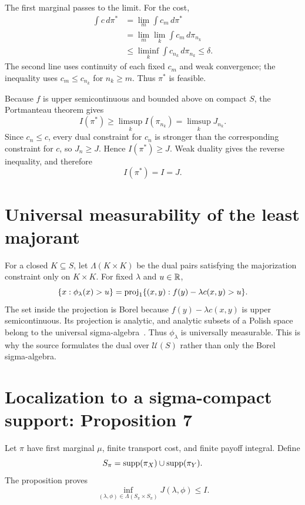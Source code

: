 The first marginal passes to the limit.  For the cost,
\begin{align*}
 \int c\,d\pi^*
 &=\lim_m\int c_m\,d\pi^*\\
 &=\lim_m\lim_k\int c_m\,d\pi_{n_k}\\
 &\le\liminf_k\int c_{n_k}\,d\pi_{n_k}\le\delta.
\end{align*}
The second line uses continuity of each fixed $c_m$ and weak convergence; the inequality uses
$c_m\le c_{n_k}$ for $n_k\ge m$.  Thus $\pi^*$ is feasible.

Because $f$ is upper semicontinuous and bounded above on compact $S$, the Portmanteau theorem gives
\[
 I(\pi^*)\ge\limsup_k I(\pi_{n_k})=
 \limsup_k J_{n_k}.
\]
Since $c_n\le c$, every dual constraint for $c_n$ is stronger than the corresponding constraint for
$c$, so $J_n\ge J$.  Hence $I(\pi^*)\ge J$.  Weak duality gives the reverse inequality, and therefore
\[
 I(\pi^*)=I=J.
\]

\section{Universal measurability of the least majorant}
For a closed $K\subseteq S$, let $\Lambda(K\times K)$ be the dual pairs satisfying the majorization
constraint only on $K\times K$.  For fixed $\lambda$ and $u\in\mathbb{R}$,
\[
 \{x:\phi_\lambda(x)>u\}
 =\operatorname{proj}_1\{(x,y):f(y)-\lambda c(x,y)>u\}.
\]
The set inside the projection is Borel because $f(y)-\lambda c(x,y)$ is upper semicontinuous.
Its projection is analytic, and analytic subsets of a Polish space belong to the universal
sigma-algebra~\cite[Chapter~7]{BertsekasShreve1978}.  Thus $\phi_\lambda$ is universally measurable.  This is why the source formulates
the dual over $\mathcal U(S)$ rather than only the Borel sigma-algebra.

\section{Localization to a sigma-compact support: Proposition 7}
Let $\pi$ have first marginal $\mu$, finite transport cost, and finite payoff integral.  Define
\[
 S_\pi=\operatorname{supp}(\pi_X)\cup\operatorname{supp}(\pi_Y).
\]
The proposition proves
\begin{equation}
 \inf_{(\lambda,\phi)\in\Lambda(S_\pi\times S_\pi)}J(\lambda,\phi)
 \le I. \label{eq:BM-prop7}
\end{equation}

